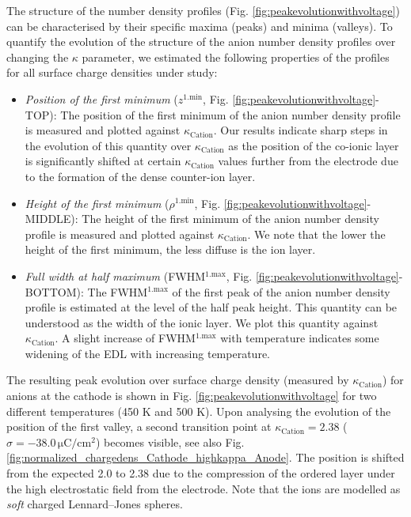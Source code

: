 \documentclass[final,5p,times,twocolumn]{elsarticle}
\begin{document}
The structure of the number density profiles (Fig. \ref{fig:peakevolutionwithvoltage}) can be characterised by their specific maxima (peaks) and minima (valleys). To quantify the evolution of the structure of the anion number density profiles over changing the $\kappa$ parameter, we estimated the following properties of the profiles for all surface charge densities under study:
\begin{itemize}
\item \emph{Position of the first minimum} ($z^\mathrm{1.min}$, Fig. \ref{fig:peakevolutionwithvoltage}-TOP): The position of the first minimum of the anion number density profile is measured and plotted against $\kappa_{\mathrm{Cation}}$. Our results indicate sharp steps in the evolution of this quantity over $\kappa_{\mathrm{Cation}}$ as the position of the co-ionic layer is significantly shifted at certain $\kappa_{\mathrm{Cation}}$ values further from the electrode due to the formation of the dense counter-ion layer.

\item \emph{Height of the first minimum} ($\rho^\mathrm{1.min}$, Fig. \ref{fig:peakevolutionwithvoltage}-MIDDLE): The height of the first minimum of the anion number density profile is measured and plotted against $\kappa_{\mathrm{Cation}}$. We note that the lower the height of the first minimum, the less diffuse is the ion layer.

\item \emph{Full width at half maximum} (FWHM$^\mathrm{1.max}$, Fig. \ref{fig:peakevolutionwithvoltage}-BOTTOM): The FWHM$^\mathrm{1.max}$ of the first peak of the anion number density profile is estimated at the level of the half peak height. This quantity can be understood as the width of the ionic layer. We plot this quantity against $\kappa_{\mathrm{Cation}}$. A slight increase of FWHM$^\mathrm{1.max}$ with temperature indicates some widening of the EDL with increasing temperature.
\end{itemize}

The resulting peak evolution over surface charge density (measured by $\kappa_{\mathrm{Cation}}$) for anions at the cathode is shown in Fig. \ref{fig:peakevolutionwithvoltage} for two different temperatures (450 K and 500 K). Upon analysing the evolution of the position of the first valley, a second transition point at $\kappa_{\mathrm{Cation}}=2.38$ ($\sigma=-38.0\,\mathrm{\mu C/cm^2}$) becomes visible, see also Fig. \ref{fig:normalized_chargedens_Cathode_highkappa_Anode}. The position is shifted from the expected 2.0 to 2.38 due to the compression of the ordered layer under the high electrostatic field from the electrode. Note that the ions are modelled as \textit{soft} charged Lennard--Jones spheres.
\end{document}
